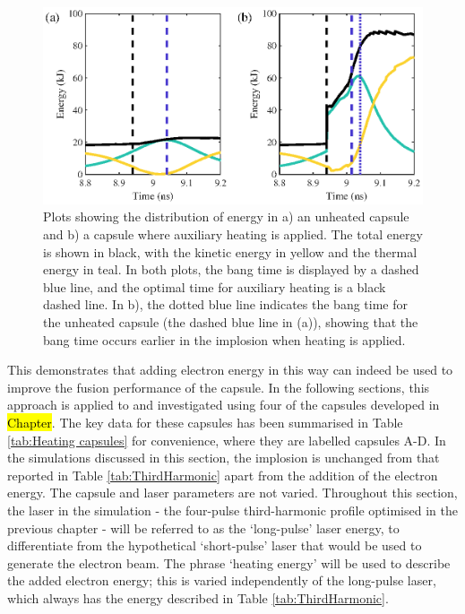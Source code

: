 \begin{figure}[ht]
\centering
\includegraphics{figures/FurtherSims/EnergyDist.eps}
\caption{Plots showing the distribution of energy in a) an unheated capsule and b) a capsule where auxiliary heating is applied. The total energy is shown in black, with the kinetic energy in yellow and the thermal energy in teal. In both plots, the bang time is displayed by a dashed blue line, and the optimal time for auxiliary heating is a black dashed line. In b), the dotted blue line indicates the bang time for the unheated capsule (the dashed blue line in (a)), showing that the bang time occurs earlier in the implosion when heating is applied.}
\label{fig:EnergyDist}
\end{figure}

This demonstrates that adding electron energy in this way can indeed be used to improve the fusion performance of the capsule. In the following sections, this approach is applied to and investigated using four of the capsules developed in \hl{Chapter}. The key data for these capsules has been summarised in Table  \ref{tab:Heating capsules} for convenience, where they are labelled capsules A-D. In the simulations discussed in this section, the implosion is unchanged from that reported in Table \ref{tab:ThirdHarmonic} apart from the addition of the electron energy. The capsule and laser parameters are not varied. Throughout this section, the laser in the simulation - the four-pulse third-harmonic profile optimised in the previous chapter - will be referred to as the `long-pulse' laser energy, to differentiate from the hypothetical `short-pulse' laser that would be used to generate the electron beam. The phrase `heating energy' will be used to describe the added electron energy; this is varied independently of the long-pulse laser, which always has the energy described in Table \ref{tab:ThirdHarmonic}.

